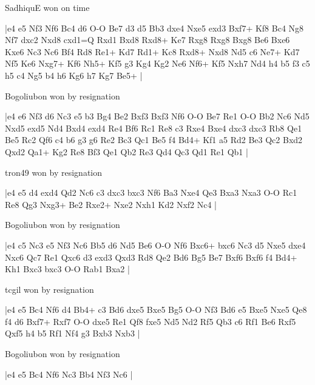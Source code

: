 \showboard

SadhiquE won on time

\makegametitle
|e4 e5 Nf3 Nf6 Bc4 d6 O-O Be7 d3 d5 Bb3 dxe4 Nxe5 exd3 Bxf7+ Kf8 Bc4 Ng8 Nf7 dxc2 Nxd8 cxd1=Q Rxd1 Bxd8 Rxd8+ Ke7 Rxg8 Rxg8 Bxg8 Be6 Bxe6 Kxe6 Nc3 Nc6 Bf4 Rd8 Re1+ Kd7 Rd1+ Kc8 Rxd8+ Nxd8 Nd5 c6 Ne7+ Kd7 Nf5 Ke6 Nxg7+ Kf6 Nh5+ Kf5 g3 Kg4 Kg2 Ne6 Nf6+ Kf5 Nxh7 Nd4 h4 b5 f3 c5 h5 c4 Ng5 b4 h6 Kg6 h7 Kg7 Be5+  |

\showboard

Bogoliubon won by resignation

\makegametitle
|e4 e6 Nf3 d6 Nc3 e5 b3 Bg4 Be2 Bxf3 Bxf3 Nf6 O-O Be7 Re1 O-O Bb2 Nc6 Nd5 Nxd5 exd5 Nd4 Bxd4 exd4 Re4 Bf6 Rc1 Re8 c3 Rxe4 Bxe4 dxc3 dxc3 Rb8 Qe1 Be5 Rc2 Qf6 c4 b6 g3 g6 Re2 Bc3 Qc1 Be5 f4 Bd4+ Kf1 a5 Rd2 Be3 Qc2 Bxd2 Qxd2 Qa1+ Kg2 Re8 Bf3 Qe1 Qb2 Re3 Qd4 Qc3 Qd1 Re1 Qb1  |

\showboard

tron49 won by resignation

\makegametitle
|e4 e5 d4 exd4 Qd2 Nc6 c3 dxc3 bxc3 Nf6 Ba3 Nxe4 Qe3 Bxa3 Nxa3 O-O Rc1 Re8 Qg3 Nxg3+ Be2 Rxe2+ Nxe2 Nxh1 Kd2 Nxf2 Nc4  |

\showboard

Bogoliubon won by resignation

\makegametitle
|e4 c5 Nc3 e5 Nf3 Nc6 Bb5 d6 Nd5 Be6 O-O Nf6 Bxc6+ bxc6 Nc3 d5 Nxe5 dxe4 Nxc6 Qc7 Re1 Qxc6 d3 exd3 Qxd3 Rd8 Qe2 Bd6 Bg5 Be7 Bxf6 Bxf6 f4 Bd4+ Kh1 Bxc3 bxc3 O-O Rab1 Bxa2  |

\showboard

tcgil won by resignation

\makegametitle
|e4 e5 Bc4 Nf6 d4 Bb4+ c3 Bd6 dxe5 Bxe5 Bg5 O-O Nf3 Bd6 e5 Bxe5 Nxe5 Qe8 f4 d6 Bxf7+ Rxf7 O-O dxe5 Re1 Qf8 fxe5 Nd5 Nd2 Rf5 Qb3 c6 Rf1 Be6 Rxf5 Qxf5 h4 b5 Rf1 Nf4 g3 Bxb3 Nxb3  |

\showboard

Bogoliubon won by resignation

\makegametitle
|e4 e5 Bc4 Nf6 Nc3 Bb4 Nf3 Nc6  |

